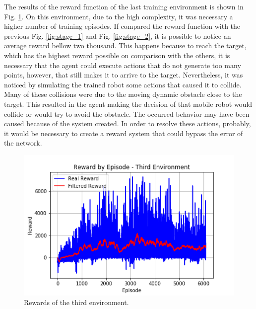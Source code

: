 The results of the reward function of the last training environment is shown in Fig. \ref{fig:stage_4}.
On this environment, due to the high complexity, it was necessary a higher number of training episodes.
If compared the reward function with the previous Fig. \ref{fig:stage_1} and Fig. \ref{fig:stage_2}, it is possible to notice an average reward bellow two thousand.
This happens because to reach the target, which has the highest reward possible on comparison with the others, it is necessary that the agent could execute actions that do not generate too many points, however, that still makes it to arrive to the target.
Nevertheless, it was noticed by simulating the trained robot some actions that caused it to collide.
Many of these collisions were due to the moving dynamic obstacle close to the target.
This resulted in the agent making the decision of that mobile robot would collide or would try to avoid the obstacle.
The occurred behavior may have been caused because of the system created.
In order to resolve these actions, probably, it would be necessary to create a reward system that could bypass the error of the network.

\begin{figure}
\centerline{\includegraphics[width=\columnwidth]{images/stage_4.png}}
\caption{Rewards of the third environment.}
\label{fig:stage_4}
\end{figure}